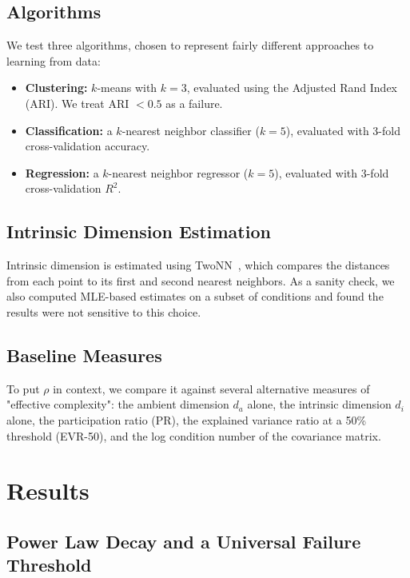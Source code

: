 \documentclass[pdflatex,sn-mathphys-num]{sn-jnl}
\theoremstyle{thmstyleone}
\begin{document}
\subsection{Algorithms}
We test three algorithms, chosen to represent fairly different approaches to
learning from data:
\begin{itemize}
    \item \textbf{Clustering:} $k$-means with $k=3$, evaluated using the
    Adjusted Rand Index (ARI). We treat ARI $< 0.5$ as a failure.
    \item \textbf{Classification:} a $k$-nearest neighbor classifier ($k=5$),
    evaluated with 3-fold cross-validation accuracy.
    \item \textbf{Regression:} a $k$-nearest neighbor regressor ($k=5$),
    evaluated with 3-fold cross-validation $R^2$.
\end{itemize}

\subsection{Intrinsic Dimension Estimation}
Intrinsic dimension is estimated using TwoNN~\cite{facco2017}, which compares
the distances from each point to its first and second nearest neighbors. As a
sanity check, we also computed MLE-based estimates on a subset of conditions
and found the results were not sensitive to this choice.

\subsection{Baseline Measures}
To put $\rho$ in context, we compare it against several alternative measures of
"effective complexity": the ambient dimension $d_a$ alone, the intrinsic
dimension $d_i$ alone, the participation ratio (PR), the explained variance
ratio at a 50\% threshold (EVR-50), and the log condition number of the
covariance matrix.

\section{Results}
\label{sec:results}

\subsection{Power Law Decay and a Universal Failure Threshold}
\end{document}
